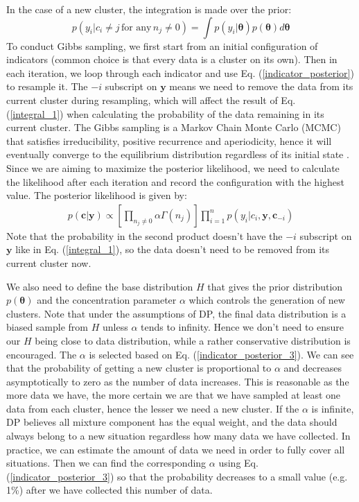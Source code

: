 \documentclass[journal]{IEEEtran}
\begin{document}
In the case of a new cluster, the integration is made over the prior:
\begin{equation}
p(y_i|c_i \neq j \, \text{for any} \, n_j \neq 0) = 
\int p(y_i|\bm{\theta})
p(\bm{\theta})d\bm{\theta}
\label{integral_2}
\end{equation}
To conduct Gibbs sampling, we first start from an initial configuration of indicators (common choice is that every data is a cluster on its own).
Then in each iteration, we loop through each indicator and use Eq. (\ref{indicator_posterior}) to resample it. 
The $-i$ subscript on $\bm{y}$ means we need to remove the data from its current cluster during resampling, which will affect the result of Eq. (\ref{integral_1}) when calculating the probability of the data remaining in its current cluster. 
The Gibbs sampling is a Markov Chain Monte Carlo (MCMC) that satisfies irreducibility, positive recurrence and aperiodicity, hence it will eventually converge to the equilibrium distribution regardless of its initial state \cite{MCMC}. 
Since we are aiming to maximize the posterior likelihood, we need to calculate the likelihood after each iteration and record the configuration with the highest value.
The posterior likelihood is given by:
\begin{equation}
\begin{gathered}
p(\bm{c}|\bm{y}) \propto 
\left[\prod_{n_j \neq 0} \alpha \Gamma(n_j)\right]
\prod_{i=1}^n p(y_i|c_i, \bm{y}, \bm{c}_{-i})
\end{gathered}
\label{posterior_likelihood}
\end{equation}
Note that the probability in the second product doesn't have the $-i$ subscript on $\bm{y}$ like in Eq. (\ref{integral_1}), so the data doesn't need to be removed from its current cluster now.


We also need to define the base distribution $H$ that gives the prior distribution $p(\bm{\theta})$ and the concentration parameter $\alpha$ which controls the generation of new clusters.
Note that under the assumptions of DP, the final data distribution is a biased sample from $H$ unless $\alpha$ tends to infinity. Hence we don't need to ensure our $H$ being close to data distribution, while a rather conservative distribution is encouraged.
The $\alpha$ is selected based on Eq. (\ref{indicator_posterior_3}).
We can see that the probability of getting a new cluster is proportional to $\alpha$ and decreases asymptotically to zero as the number of data increases.
This is reasonable as the more data we have, the more certain we are that we have sampled at least one data from each cluster, hence the lesser we need a new cluster. 
If the $\alpha$ is infinite, DP believes all mixture component has the equal weight, and the data should always belong to a new situation regardless how many data we have collected.
In practice, we can estimate the amount of data we need in order to fully cover all situations. Then we can find the corresponding $\alpha$ using Eq. (\ref{indicator_posterior_3}) so that the probability decreases to a small value (e.g. 1\%) after we have collected this number of data.
\end{document}
